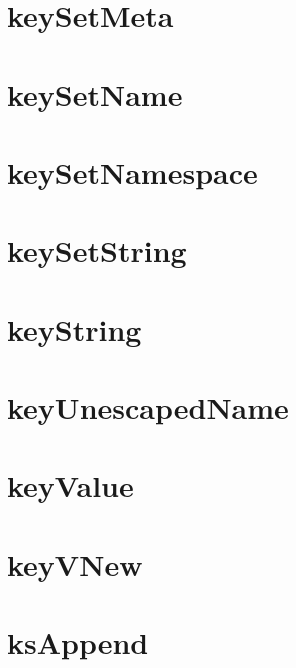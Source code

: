 \let\mypdfximage\pdfximage\def\pdfximage{\immediate\mypdfximage}\documentclass[twoside]{book}
\newcommand{\+}{\discretionary{\mbox{\scriptsize$\hookleftarrow$}}{}{}}
\begin{document}
\chapter{key\+Set\+Meta}
\label{doc_api_review_core_keySetMeta_md}

\chapter{key\+Set\+Name}
\label{doc_api_review_core_keySetName_md}

\chapter{key\+Set\+Namespace}
\label{doc_api_review_core_keySetNamespace_md}

\chapter{key\+Set\+String}
\label{doc_api_review_core_keySetString_md}

\chapter{key\+String}
\label{doc_api_review_core_keyString_md}

\chapter{key\+Unescaped\+Name}
\label{doc_api_review_core_keyUnescapedName_md}

\chapter{key\+Value}
\label{doc_api_review_core_keyValue_md}

\chapter{key\+VNew}
\label{doc_api_review_core_keyVNew_md}

\chapter{ks\+Append}
\label{doc_api_review_core_ksAppend_md}

\end{document}
